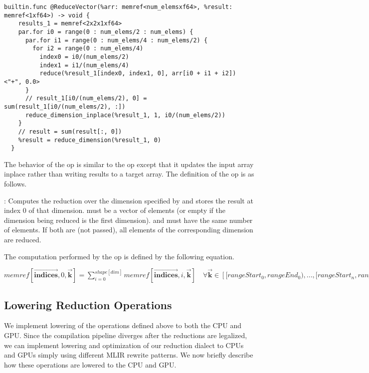 \begin{lstlisting}[style=c++]
  builtin.func @ReduceVector(%arr: memref<num_elemsxf64>, %result: memref<1xf64>) -> void {
    results_1 = memref<2x2x1xf64>
    par.for i0 = range(0 : num_elems/2 : num_elems) {
      par.for i1 = range(0 : num_elems/4 : num_elems/2) {
        for i2 = range(0 : num_elems/4) 
          index0 = i0/(num_elems/2)
          index1 = i1/(num_elems/4)
          reduce(%result_1[index0, index1, 0], arr[i0 + i1 + i2]) <"+", 0.0>
      }
      // result_1[i0/(num_elems/2), 0] = sum(result_1[i0/(num_elems/2), :])
      reduce_dimension_inplace(%result_1, 1, i0/(num_elems/2)) 
    }
    // result = sum(result[:, 0])
    %result = reduce_dimension(%result_1, 0)
  }
\end{lstlisting}

The behavior of the  op is similar to the 
 op except that it updates the input array inplace
rather than writing results to a target array. The definition of the 
op is as follows. 

\begin{definition}
 \textbf{}:
  Computes the reduction over the dimension specified by  and stores the 
  result at index 0 of that dimension. \op{[indices]} must be a vector of  elements
   (or empty if the dimension being reduced is the first dimension). \op{[rangeStart]} 
   and \op{[rangeEnd]} must have the same number of elements. If both are  (not passed), 
   all elements of the corresponding dimension are reduced. 
  
  The computation performed by the op is defined by the following equation.
  
  $memref[\vec{\boldsymbol{indices}}, 0, \vec{\boldsymbol{k}}] = \sum_{i=0}^{shape[dim]} memref[\vec{\boldsymbol{indices}}, i, \vec{\boldsymbol{k}}]\quad   \forall \vec{\boldsymbol{k}} \in \left[[rangeStart_0, rangeEnd_0), ... , [rangeStart_n, rangeEnd_n)\right]$  
\end{definition}

\subsection{Lowering Reduction Operations}
We implement lowering of the operations defined above to both the CPU and GPU.
Since the compilation pipeline diverges after the reductions are legalized, 
we can implement lowering and optimization of our reduction dialect to CPUs and
GPUs simply using different MLIR rewrite patterns. We now briefly describe 
how these operations are lowered to the CPU and GPU. 

